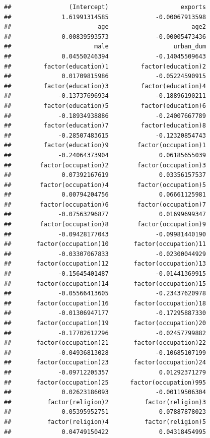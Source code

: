 \documentclass[]{book}
\theoremstyle{definition}
\theoremstyle{definition}
\theoremstyle{definition}
\theoremstyle{remark}
\begin{document}
\begin{verbatim}
##                (Intercept)                    exports 
##              1.61991314585             -0.00067913598 
##                        age                       age2 
##              0.00839593573             -0.00005473436 
##                       male                  urban_dum 
##              0.04550246394             -0.14045509643 
##         factor(education)1         factor(education)2 
##              0.01709815986             -0.05224590915 
##         factor(education)3         factor(education)4 
##             -0.13737696934             -0.18896190211 
##         factor(education)5         factor(education)6 
##             -0.18934938886             -0.24007667789 
##         factor(education)7         factor(education)8 
##             -0.28507483615             -0.12320854743 
##         factor(education)9        factor(occupation)1 
##             -0.24064373904              0.06185655039 
##        factor(occupation)2        factor(occupation)3 
##              0.07392167619              0.03356157537 
##        factor(occupation)4        factor(occupation)5 
##              0.00794204756              0.06661125981 
##        factor(occupation)6        factor(occupation)7 
##             -0.07563296877              0.01699699347 
##        factor(occupation)8        factor(occupation)9 
##             -0.09428177043             -0.09981440190 
##       factor(occupation)10       factor(occupation)11 
##             -0.03307067833             -0.02300044929 
##       factor(occupation)12       factor(occupation)13 
##             -0.15645401487             -0.01441369915 
##       factor(occupation)14       factor(occupation)15 
##             -0.05566413605             -0.23437620978 
##       factor(occupation)16       factor(occupation)18 
##             -0.01306947177             -0.17295887330 
##       factor(occupation)19       factor(occupation)20 
##             -0.17702612296             -0.02457799882 
##       factor(occupation)21       factor(occupation)22 
##             -0.04936813028             -0.10685107199 
##       factor(occupation)23       factor(occupation)24 
##             -0.09712205357              0.01292371279 
##       factor(occupation)25      factor(occupation)995 
##              0.02623186093             -0.00119506304 
##          factor(religion)2          factor(religion)3 
##              0.05395952751              0.07887878023 
##          factor(religion)4          factor(religion)5 
##              0.04749150422              0.04318454995 

\end{verbatim}
\end{document}
